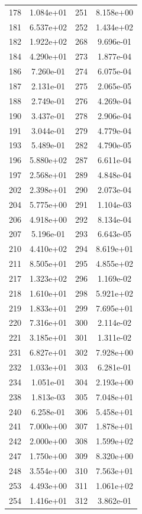 \documentclass[12pt]{article}
\begin{document}
\begin{longtable}{@{}cccc@{}}
178 & 1.084e+01 & 251 & 8.158e+00 \\
181 & 6.537e+02 & 252 & 1.434e+02 \\
182 & 1.922e+02 & 268 & 9.696e-01 \\
184 & 4.290e+01 & 273 & 1.877e-04 \\
186 & 7.260e-01 & 274 & 6.075e-04 \\
187 & 2.131e-01 & 275 & 2.065e-05 \\
188 & 2.749e-01 & 276 & 4.269e-04 \\
190 & 3.437e-01 & 278 & 2.906e-04 \\
191 & 3.044e-01 & 279 & 4.779e-04 \\
193 & 5.489e-01 & 282 & 4.790e-05 \\
196 & 5.880e+02 & 287 & 6.611e-04 \\
197 & 2.568e+01 & 289 & 4.848e-04 \\
202 & 2.398e+01 & 290 & 2.073e-04 \\
204 & 5.775e+00 & 291 & 1.104e-03 \\
206 & 4.918e+00 & 292 & 8.134e-04 \\
207 & 5.196e-01 & 293 & 6.643e-05 \\
210 & 4.410e+02 & 294 & 8.619e+01 \\
211 & 8.505e+01 & 295 & 4.855e+02 \\
217 & 1.323e+02 & 296 & 1.169e-02 \\
218 & 1.610e+01 & 298 & 5.921e+02 \\
219 & 1.833e+01 & 299 & 7.695e+01 \\
220 & 7.316e+01 & 300 & 2.114e-02 \\
221 & 3.185e+01 & 301 & 1.311e-02 \\
231 & 6.827e+01 & 302 & 7.928e+00 \\
232 & 1.033e+01 & 303 & 6.281e-01 \\
234 & 1.051e-01 & 304 & 2.193e+00 \\
238 & 1.813e-03 & 305 & 7.048e+01 \\
240 & 6.258e-01 & 306 & 5.458e+01 \\
241 & 7.000e+00 & 307 & 1.878e+01 \\
242 & 2.000e+00 & 308 & 1.599e+02 \\
247 & 1.750e+00 & 309 & 8.320e+00 \\
248 & 3.554e+00 & 310 & 7.563e+01 \\
253 & 4.493e+00 & 311 & 1.061e+02 \\
254 & 1.416e+01 & 312 & 3.862e-01 \\

\end{longtable}
\end{document}
